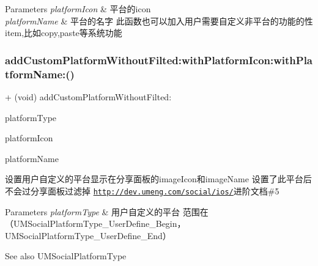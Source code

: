 \begin{DoxyParams}{Parameters}
{\em platform\+Icon} & 平台的icon \\
\hline
{\em platform\+Name} & 平台的名字  此函数也可以加入用户需要自定义非平台的功能的性item,比如copy,paste等系统功能 \\
\hline
\end{DoxyParams}
\mbox{\label{interface_u_m_social_u_i_manager_a476b572ec6e1b4a7a33c4cd66df8f343}} 
\subsubsection{\texorpdfstring{add\+Custom\+Platform\+Without\+Filted\+:with\+Platform\+Icon\+:with\+Platform\+Name\+:()}{addCustomPlatformWithoutFilted:withPlatformIcon:withPlatformName:()}\hspace{0.1cm}{\footnotesize\ttfamily [2/2]}}
{\footnotesize\ttfamily + (void) add\+Custom\+Platform\+Without\+Filted\+: \begin{DoxyParamCaption}\item[{(U\+M\+Social\+Platform\+Type)}]{platform\+Type }\item[{withPlatformIcon:(U\+I\+Image $\ast$)}]{platform\+Icon }\item[{withPlatformName:(N\+S\+String $\ast$)}]{platform\+Name }\end{DoxyParamCaption}}

设置用户自定义的平台显示在分享面板的image\+Icon和image\+Name 设置了此平台后不会过分享面板过滤掉 \href{http://dev.umeng.com/social/ios/}{\tt http\+://dev.\+umeng.\+com/social/ios/}进阶文档\#5


\begin{DoxyParams}{Parameters}
{\em platform\+Type} & 用户自定义的平台 范围在（\+U\+M\+Social\+Platform\+Type\+\_\+\+User\+Define\+\_\+\+Begin，\+U\+M\+Social\+Platform\+Type\+\_\+\+User\+Define\+\_\+\+End） \\
\hline
\end{DoxyParams}
\begin{DoxySeeAlso}{See also}
U\+M\+Social\+Platform\+Type 
\end{DoxySeeAlso}

